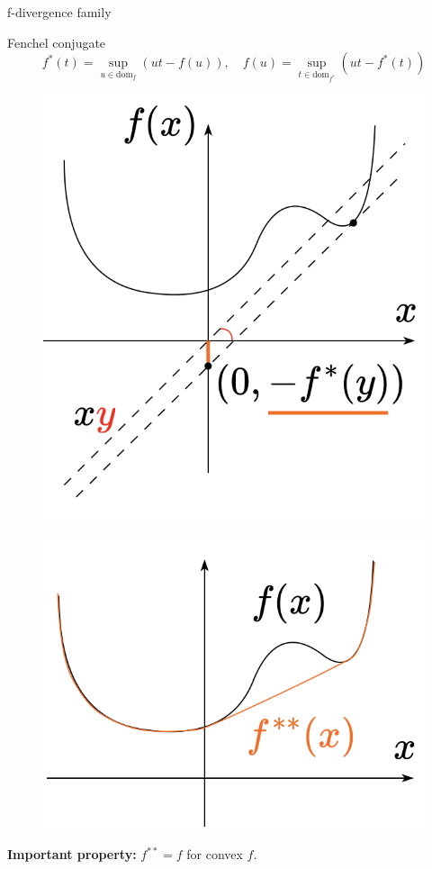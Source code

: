\begin{frame}{f-divergence family}
	\vspace{-0.3cm}
	\begin{block}{Fenchel conjugate}
		\vspace{-0.5cm}
		\[
		f^*(t) = \sup_{u \in \text{dom}_f} \left( ut - f(u) \right), \quad f(u) = \sup_{t \in \text{dom}_{f^*}} \left( ut - f^*(t) \right)
		\]
		\vspace{-0.3cm}
	\end{block}
	\vspace{-0.3cm}
	\begin{minipage}[t]{0.5\columnwidth}
		\begin{figure}
			\centering
			\includegraphics[width=0.8\linewidth]{figs/conj}
		\end{figure}
	\end{minipage}%
	\begin{minipage}[t]{0.5\columnwidth}
		\begin{figure}
			\centering
			\includegraphics[width=0.85\linewidth]{figs/double_conj}
		\end{figure}
	\end{minipage}
	\textbf{Important property:} $ f^{**} = f$ for convex $f$.
\end{frame}
